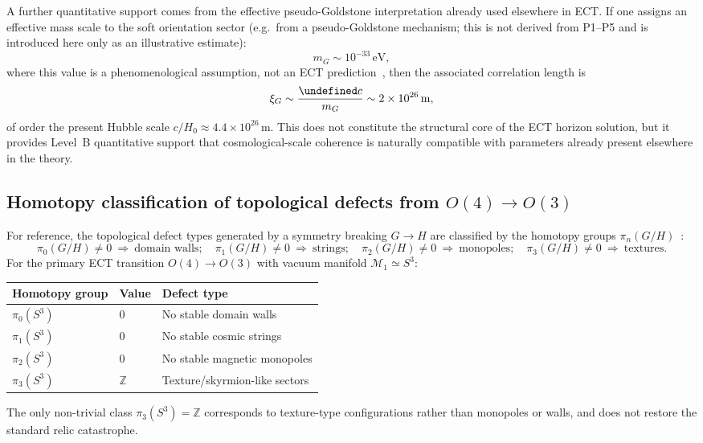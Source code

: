 \documentclass[11pt,a4paper]{article}
\let\hbar\undefined
\numberwithin{equation}{section}
\begin{document}
A further quantitative support comes from the effective
pseudo-Goldstone interpretation already used elsewhere in ECT.
If one assigns an effective mass scale to the soft orientation sector
(e.g.~from a pseudo-Goldstone mechanism; this is not derived from P1--P5
and is introduced here only as an illustrative estimate):
\[
m_G\sim 10^{-33}\,\mathrm{eV},
\]
where this value is a phenomenological assumption, not an ECT prediction~\cite{McGaugh2016}, then the associated correlation length is
\[
\xi_G \sim \frac{\hbar c}{m_G}\sim 2\times 10^{26}\,\mathrm{m},
\]
of order the present Hubble scale $c/H_0\approx 4.4\times 10^{26}$\,m.
This does not constitute the structural core of the ECT horizon
solution, but it provides Level~B quantitative support that
cosmological-scale coherence is naturally compatible with parameters
already present elsewhere in the theory.

\subsection*{Homotopy classification of topological defects from
$O(4)\to O(3)$}
\label{app:relic_homotopy}

For reference, the topological defect types generated by a symmetry
breaking $G\to H$ are classified by the homotopy groups
$\pi_n(G/H)$~\cite{Nakahara2003}:
\[
\pi_0(G/H)\neq 0\ \Rightarrow\ \text{domain walls};\quad
\pi_1(G/H)\neq 0\ \Rightarrow\ \text{strings};\quad
\pi_2(G/H)\neq 0\ \Rightarrow\ \text{monopoles};\quad
\pi_3(G/H)\neq 0\ \Rightarrow\ \text{textures}.
\]
For the primary ECT transition $O(4)\to O(3)$ with vacuum manifold
$\mathcal{M}_1\simeq S^3$:
\begin{center}\small
\begin{tabular}{@{}lll@{}}
\toprule
Homotopy group & Value & Defect type \\
\midrule
$\pi_0(S^3)$ & $0$ & No stable domain walls \\
$\pi_1(S^3)$ & $0$ & No stable cosmic strings \\
$\pi_2(S^3)$ & $0$ & No stable magnetic monopoles \\
$\pi_3(S^3)$ & $\mathbb{Z}$ & Texture/skyrmion-like sectors \\
\bottomrule
\end{tabular}
\end{center}
The only non-trivial class $\pi_3(S^3)=\mathbb{Z}$ corresponds to
texture-type configurations rather than monopoles or walls, and does
not restore the standard relic catastrophe.
\end{document}
